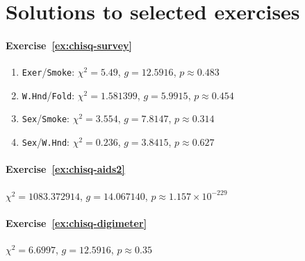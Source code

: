 \section{Solutions to selected exercises}
\label{sec:chi-squared-solutions}

\paragraph{Exercise~\ref{ex:chisq-survey}}

\begin{enumerate}
  \item \texttt{Exer}/\texttt{Smoke}: $\chi^2 = 5.49$, $g = 12.5916$, $p \approx 0.483$
  \item \texttt{W.Hnd}/\texttt{Fold}: $\chi^2 = 1.581399$, $g = 5.9915$, $p \approx 0.454$
  \item \texttt{Sex}/\texttt{Smoke}: $\chi^2 = 3.554$, $g = 7.8147$, $p \approx 0.314$
  \item \texttt{Sex}/\texttt{W.Hnd}: $\chi^2 = 0.236$, $g = 3.8415$, $p \approx 0.627$
\end{enumerate}

\paragraph{Exercise~\ref{ex:chisq-aids2}} $\chi^2 = 1083.372914$, $g = 14.067140$, $p \approx 1.157 \times 10^{-229}$

\paragraph{Exercise~\ref{ex:chisq-digimeter}} $\chi^2 = 6.6997$, $g = 12.5916$, $p \approx 0.35$